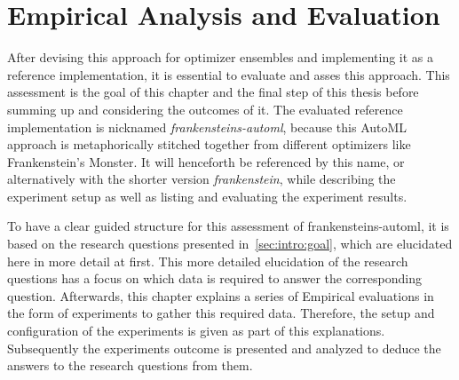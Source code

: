 %
\chapter{Empirical Analysis and Evaluation}
\label{sec:evaluation}
After devising this approach for optimizer ensembles and implementing it as a reference implementation, it is essential to evaluate and asses this approach.
This assessment is the goal of this chapter and the final step of this thesis before summing up and considering the outcomes of it.\newline
The evaluated reference implementation is nicknamed \textit{frankensteins-automl}, because this AutoML approach is metaphorically stitched together from different optimizers like Frankenstein's Monster.
It will henceforth be referenced by this name, or alternatively with the shorter version \textit{frankenstein}, while describing the experiment setup as well as listing and evaluating the experiment results.

To have a clear guided structure for this assessment of frankensteins-automl, it is based on the research questions presented in~\ref{sec:intro:goal}, which are elucidated here in more detail at first.
This more detailed elucidation of the research questions has a focus on which data is required to answer the corresponding question.\newline
Afterwards, this chapter explains a series of Empirical evaluations in the form of experiments to gather this required data.
Therefore, the setup and configuration of the experiments is given as part of this explanations.\newline
Subsequently the experiments outcome is presented and analyzed to deduce the answers to the research questions from them.

